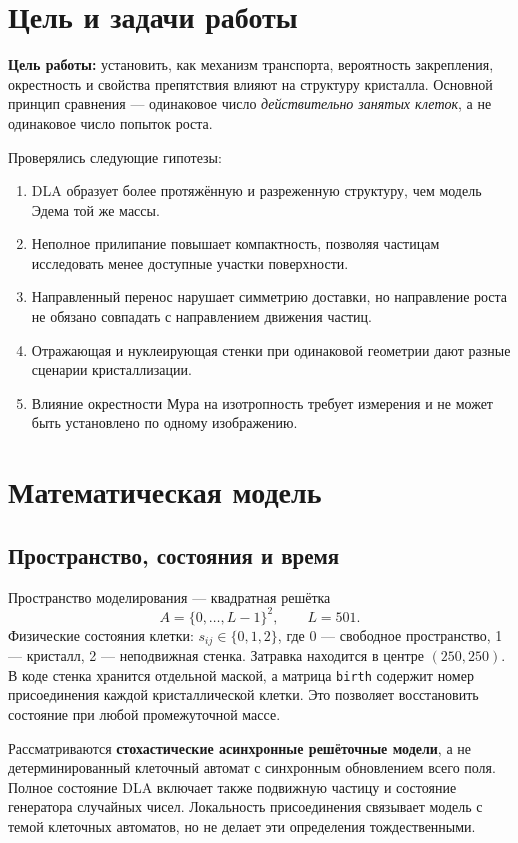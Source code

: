 \documentclass[12pt,a4paper]{article}
\begin{document}
\hypersetup{pageanchor=false}

\setcounter{page}{1}
\hypersetup{pageanchor=true}
\tableofcontents
\newpage

\section{Цель и задачи работы}
\textbf{Цель работы:} установить, как механизм транспорта, вероятность закрепления,
окрестность и свойства препятствия влияют на структуру кристалла. Основной
принцип сравнения --- одинаковое число \emph{действительно занятых клеток},
а не одинаковое число попыток роста.

Проверялись следующие гипотезы:
\begin{enumerate}
\item DLA образует более протяжённую и разреженную структуру, чем модель Эдема той же массы.
\item Неполное прилипание повышает компактность, позволяя частицам исследовать менее доступные участки поверхности.
\item Направленный перенос нарушает симметрию доставки, но направление роста не обязано совпадать с направлением движения частиц.
\item Отражающая и нуклеирующая стенки при одинаковой геометрии дают разные сценарии кристаллизации.
\item Влияние окрестности Мура на изотропность требует измерения и не может быть установлено по одному изображению.
\end{enumerate}

\section{Математическая модель}
\subsection{Пространство, состояния и время}
Пространство моделирования --- квадратная решётка
\[
 A=\{0,\ldots,L-1\}^2,\qquad L=501.
\]
Физические состояния клетки: $s_{ij}\in\{0,1,2\}$, где 0 --- свободное
пространство, 1 --- кристалл, 2 --- неподвижная стенка. Затравка находится
в центре $(250,250)$. В коде стенка хранится отдельной маской, а матрица
\texttt{birth} содержит номер присоединения каждой кристаллической клетки.
Это позволяет восстановить состояние при любой промежуточной массе.

Рассматриваются \textbf{стохастические асинхронные решёточные модели},
а не детерминированный клеточный автомат с синхронным обновлением всего поля.
Полное состояние DLA включает также подвижную частицу и состояние генератора
случайных чисел. Локальность присоединения связывает модель с темой клеточных
автоматов, но не делает эти определения тождественными.
\end{document}
